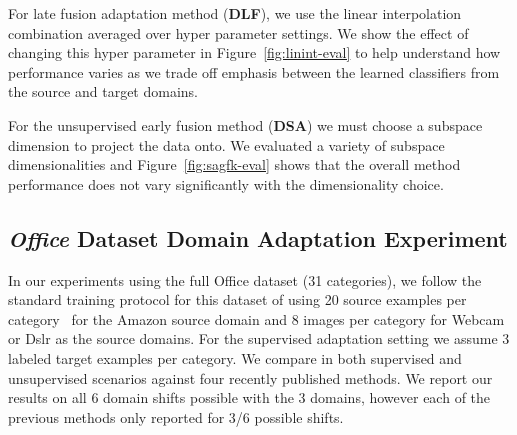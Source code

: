   For late fusion adaptation method (\textbf{DLF}), we use the linear interpolation combination averaged over hyper parameter settings. We show the effect of changing this hyper parameter in Figure~\ref{fig:linint-eval} to help understand how performance varies as we trade off emphasis between the learned classifiers from the source and target domains. 

  For the unsupervised early fusion method (\textbf{DSA}) we must choose a subspace dimension to project the data onto. We evaluated a variety of
  subspace dimensionalities and Figure~\ref{fig:sagfk-eval} shows that the overall method performance does not vary significantly with the dimensionality choice.

\subsection{\emph{Office} Dataset Domain Adaptation Experiment}
In our experiments using the full Office dataset (31 categories),
we follow the standard training protocol for this dataset of using 20 source
examples per category~\cite{saenko-eccv10,gong-cvpr12}
 for the Amazon source domain and 8 images per category for Webcam or
 Dslr as the source domains. For the supervised adaptation setting 
 we assume 3 labeled target examples per category.
We compare in both supervised and unsupervised scenarios against four recently published methods.
We report our results on all 6 domain shifts possible with the 3 domains, however each of the previous methods only reported for  3/6 possible shifts.

